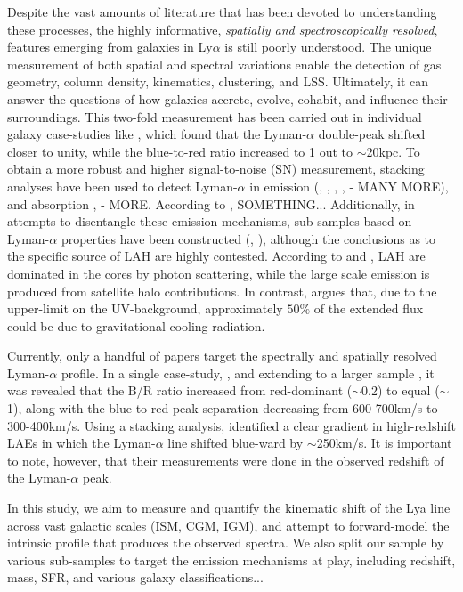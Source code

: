 \documentclass[linenumbers,amsmath,trackchanges,preprint2]{aastex702}
\begin{document}
\par Despite the vast amounts of literature that has been devoted to understanding these processes, the highly informative, \textit{spatially and spectroscopically resolved}, features emerging from galaxies in Ly$\alpha$ is still poorly understood. The unique measurement of both spatial and spectral variations enable the detection of gas geometry, column density, kinematics, clustering, and LSS. Ultimately, it can answer the questions of how galaxies accrete, evolve, cohabit, and influence their surroundings. This two-fold measurement has been carried out in individual galaxy case-studies like \cite{erb2018}, which found that the Lyman-$\alpha$ double-peak shifted closer to unity, while the blue-to-red ratio increased to 1 out to $\sim$20kpc. To obtain a more robust and higher signal-to-noise (SN) measurement, stacking analyses have been used to detect Lyman-$\alpha$ in emission (\cite{steidel2011}, \cite{niemeyer2022hetdex}, \cite{erb2023}, \cite{guo2024muse}, \cite{trainor2025} - MANY MORE), and absorption {\cite{rudie2012}, \cite{chen2020} - MORE}. According to \cite{leclercq2017}, SOMETHING...
Additionally, in attempts to disentangle these emission mechanisms, sub-samples based on Lyman-$\alpha$ properties have been constructed (\cite{steidel2011}, \cite{trainor2025}), although the conclusions as to the specific source of LAH are highly contested. According to \cite{niemeyer2022hetdex} and \cite{byrohl2021}, LAH are dominated in the cores by photon scattering, while the large scale emission is produced from satellite halo contributions. In contrast, \cite{lake2015} argues that, due to the upper-limit on the UV-background, approximately $50\%$ of the extended flux could be due to gravitational cooling-radiation.
\par Currently, only a handful of papers target the spectrally and spatially resolved Lyman-$\alpha$ profile. In a single case-study, \cite{erb2018}, and extending to a larger sample \cite{erb2023}, it was revealed that the B/R ratio increased from red-dominant ($\sim$0.2) to equal ($\sim$1), along with the blue-to-red peak separation decreasing from 600-700km/s to 300-400km/s. Using a stacking analysis, \cite{guo2024spec} identified a clear gradient in high-redshift LAEs in which the Lyman-$\alpha$ line shifted blue-ward by $\sim$250km/s. It is important to note, however, that their measurements were done in the observed redshift of the Lyman-$\alpha$ peak.
\par In this study, we aim to measure and quantify the kinematic shift of the Lya line across vast galactic scales (ISM, CGM, IGM), and attempt to forward-model the intrinsic profile that produces the observed spectra. We also split our sample by various sub-samples to target the emission mechanisms at play, including redshift, mass, SFR, and various galaxy classifications...
\end{document}
